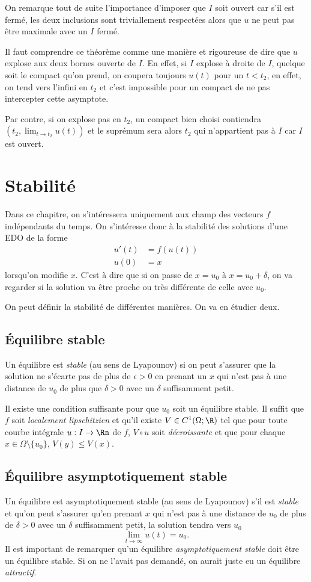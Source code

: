 On remarque tout de suite l'importance d'imposer que $I$ soit ouvert
car s'il est fermé, les deux inclusions sont triviallement respectées
alors que $u$ ne peut pas être maximale avec un $I$ fermé.

Il faut comprendre ce théorème comme une manière et rigoureuse de dire que
$u$ explose aux deux bornes ouverte de $I$.
En effet, si $I$ explose à droite de $I$,
quelque soit le compact qu'on prend, on coupera toujours $u(t)$ pour un
$t < t_2$, en effet, on tend vers l'infini en $t_2$ et c'est impossible
pour un compact de ne pas intercepter cette asymptote.

Par contre, si on explose pas en $t_2$, un compact bien choisi
contiendra $(t_2, \lim_{t \to t_2} u(t))$ et le suprémum sera alors $t_2$
qui n'appartient pas à $I$ car $I$ est ouvert.

\section{Stabilité}
Dans ce chapitre, on s'intéressera uniquement aux
champ des vecteurs $f$ indépendants du temps.
On s'intéresse donc à la stabilité des solutions d'une EDO de la forme
\begin{align*}
  u'(t) & = f(u(t))\\
  u(0) & = x
\end{align*}
lorsqu'on modifie $x$.
C'est à dire que si on passe de $x = u_0$ à $x = u_0 + \delta$,
on va regarder si
la solution va être proche ou très différente de celle avec $u_0$.

On peut définir la stabilité de différentes manières.
On va en étudier deux.

\subsection{Équilibre stable}
Un équilibre est \emph{stable} (au sens de Lyapounov)
si on peut s'assurer que la
solution ne s'écarte pas de plus de $\epsilon>0$
en prenant un $x$ qui n'est pas
à une distance de $u_0$ de plus que $\delta>0$ avec un $\delta$
suffisamment petit.

Il existe une condition suffisante pour que $u_0$ soit un équilibre stable.
Il suffit que $f$ soit \emph{localement lipschitzien} et qu'il existe
$V \in C^1(\Omega;\R)$ tel que pour toute courbe intégrale $u:I\to\Rn$ de $f$,
$V \circ u$ soit \emph{décroissante} et
que pour chaque $x\in\Omega\setminus\{u_0\}$,
$V(y) \leq V(x)$.%

\subsection{Équilibre asymptotiquement stable}
Un équilibre est asymptotiquement stable (au sens de Lyapounov)
s'il est \emph{stable}
et qu'on peut s'assurer qu'en prenant $x$ qui n'est pas à une distance
de $u_0$ de plus de $\delta>0$ avec un $\delta$ suffisamment petit,
la solution tendra vers $u_0$
\[ \lim_{t\to\infty}u(t) = u_0. \]
Il est important de remarquer qu'un équilibre \emph{asymptotiquement stable}
doit être un équilibre stable.
Si on ne l'avait pas demandé, on aurait juste
eu un équilibre \emph{attractif}.

